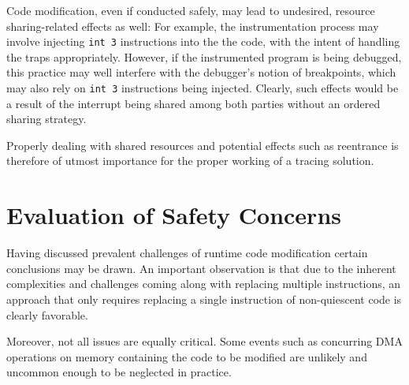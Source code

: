 Code modification, even if conducted safely, may lead to undesired, resource sharing-related 
effects as well: For example, the instrumentation process may involve injecting \verb|int 3| 
instructions into the the code, with the intent of handling the traps appropriately. However, 
if the instrumented program is being debugged, this practice may well interfere with the debugger's
notion of breakpoints, which may also rely on \verb|int 3| instructions being injected. Clearly,
such effects would be a result of the interrupt being shared among both parties without
an ordered sharing strategy.

Properly dealing with shared resources and potential effects such as reentrance is therefore of utmost
importance for the proper working of a tracing solution. 



\section{Evaluation of Safety Concerns}
Having discussed prevalent challenges of runtime code modification certain conclusions may
be drawn. An important observation is that due to the inherent complexities and challenges
coming along with replacing multiple instructions, an approach that only requires replacing
a single instruction of non-quiescent code is clearly favorable.

Moreover, not all issues are equally critical. Some events such as concurring DMA operations
on memory containing the code to be modified are unlikely and uncommon enough to be neglected
in practice.

	  
	  
	  





